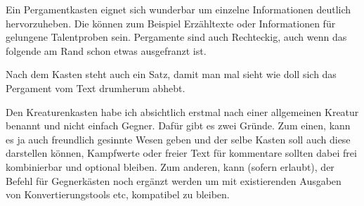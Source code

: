 \documentclass{Ilaris}
\begin{document}


Ein Pergamentkasten eignet sich wunderbar um einzelne Informationen deutlich hervorzuheben. Die können zum Beispiel Erzähltexte oder Informationen für gelungene Talentproben sein. Pergamente sind auch Rechteckig, auch wenn das folgende am Rand schon etwas ausgefranzt ist.


Nach dem Kasten steht auch ein Satz, damit man mal sieht wie doll sich das Pergament vom Text drumherum abhebt.
\spaltenumbruch

Den Kreaturenkasten habe ich absichtlich erstmal nach einer allgemeinen Kreatur benannt und nicht einfach Gegner. Dafür gibt es zwei Gründe. Zum einen, kann es ja auch freundlich gesinnte Wesen geben und der selbe Kasten soll auch diese darstellen können, Kampfwerte oder freier Text für kommentare sollten dabei frei kombinierbar und optional bleiben. Zum anderen, kann (sofern erlaubt), der Befehl für Gegnerkästen noch ergänzt werden um mit existierenden Ausgaben von Konvertierungstools etc, kompatibel zu bleiben.


\end{document}

